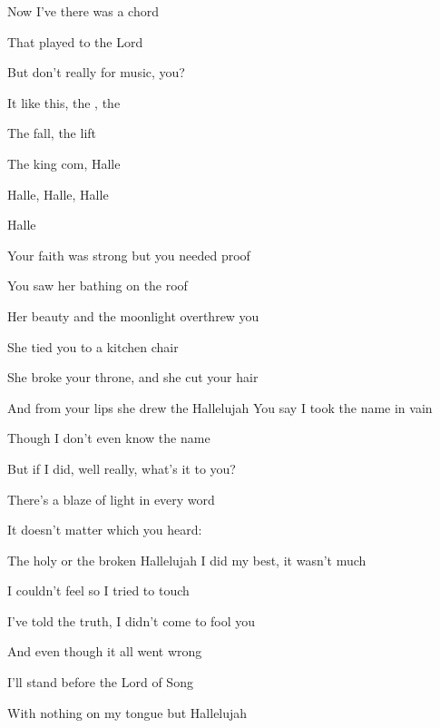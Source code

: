 

      

\zs
Now I've  there was a  chord

That  played to  the Lord

But  don't really  for music,  you? 

It  like this, the , the 

The  fall, the  lift

The  king com, Halle
\ks

\zr
Halle, Halle, Halle

Halle    
\kr

\zs
Your faith was strong but you needed proof

You saw her bathing on the roof

Her beauty and the moonlight overthrew you

She tied you to a kitchen chair

She broke your throne, and she cut your hair

And from your lips she drew the Hallelujah
\ks
\zr \kr
\zs
You say I took the name in vain

Though I don't even know the name

But if I did, well really, what's it to you?

There's a blaze of light in every word

It doesn't matter which you heard:

The holy or the broken Hallelujah
\ks
\zr \kr
\zs
I did my best, it wasn't much

I couldn't feel so I tried to touch

I've told the truth, I didn't come to fool you

And even though it all went wrong

I'll stand before the Lord of Song

With nothing on my tongue but Hallelujah
\ks
\zr \kr
\kp
